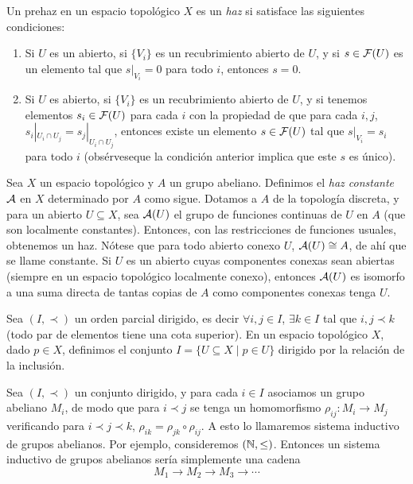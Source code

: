 \documentclass[GA.tex]{subfiles}
\begin{document}
\begin{defi}
Un prehaz en un espacio topológico $X$ es un \emph{haz} si satisface las siguientes condiciones:
\begin{enumerate}
\item Si $U$ es un abierto, si $\{V_i\}$ es un recubrimiento abierto de $U$, y si $s\in\mathcal{F}(U)$ es un elemento tal que $s|_{V_i}=0$ para todo $i$, entonces $s=0$. 
\item Si $U$ es abierto, si $\{V_i\}$ es un recubrimiento abierto de $U$, y si tenemos elementos $s_i\in\mathcal{F}(U)$ para cada $i$ con la propiedad de que para cada $i,j$, $s_i|_{U_i\cap U_j}=s_j|_{U_i\cap U_j}$, entonces existe un elemento $s\in\mathcal{F}(U)$ tal que $s|_{V_i}=s_i$ para todo $i$ (obsérveseque la condición anterior implica que este $s$ es único). 
\end{enumerate}
\end{defi}



\begin{ej}
Sea $X$ un espacio topológico y $A$ un grupo abeliano. Definimos el \emph{haz constante} $\mathcal{A}$ en $X$ determinado por $A$ como sigue. Dotamos a $A$ de la topología discreta, y para un abierto $U\subseteq X$, sea $\mathcal{A}(U)$ el grupo de funciones continuas de $U$ en $A$ (que son localmente constantes). Entonces, con las restricciones de funciones usuales, obtenemos un haz. Nótese que para todo abierto conexo $U$, $\mathcal{A}(U)\cong A$, de ahí que se llame constante. Si $U$ es un abierto cuyas componentes conexas sean abiertas (siempre en un espacio topológico localmente conexo), entonces $\mathcal{A}(U)$ es isomorfo a una suma directa de tantas copias de $A$ como componentes conexas tenga $U$. 
\end{ej}

Sea $(I,\prec)$ un orden parcial dirigido, es decir $\forall i,j\in I$, $\exists k\in I$ tal que $i,j\prec k$ (todo par de elementos tiene una cota superior). En un espacio topológico $X$, dado $p\in X$, definimos el conjunto $I=\{U\subseteq X\mid p\in U\}$ dirigido por la relación de la inclusión.

Sea $(I,\prec)$ un conjunto dirigido, y para cada $i\in I$ asociamos un grupo abeliano $M_i$, de modo que para $i\prec j$ se tenga un homomorfismo $\rho_{ij}:M_i\to M_j$ verificando para $i\prec j\prec k$, $\rho_{ik}=\rho_{jk}\circ\rho_{ij}$. A esto lo llamaremos sistema inductivo de grupos abelianos. Por ejemplo, consideremos $(\mathbb{N},\leq)$. Entonces un sistema inductivo de grupos abelianos sería simplemente una cadena
\[
M_1\to M_2\to M_3\to\cdots
\]
\end{document}
